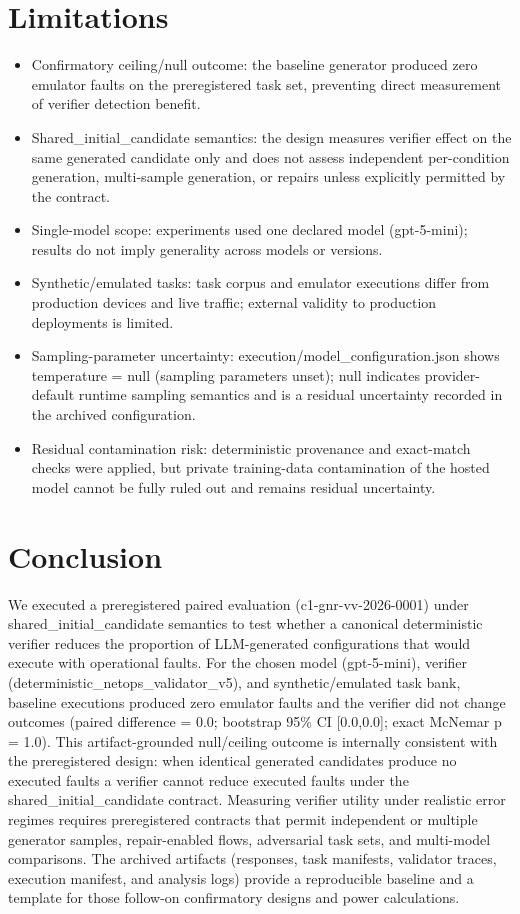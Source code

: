 \documentclass[conference]{IEEEtran}
\begin{document}
\section{Limitations}
\begin{itemize}
\item Confirmatory ceiling/null outcome: the baseline generator produced zero emulator faults on the preregistered task set, preventing direct measurement of verifier detection benefit.
\item Shared\_initial\_candidate semantics: the design measures verifier effect on the same generated candidate only and does not assess independent per-condition generation, multi-sample generation, or repairs unless explicitly permitted by the contract.
\item Single-model scope: experiments used one declared model (gpt-5-mini); results do not imply generality across models or versions.
\item Synthetic/emulated tasks: task corpus and emulator executions differ from production devices and live traffic; external validity to production deployments is limited.
\item Sampling-parameter uncertainty: execution/model\_configuration.json shows temperature = null (sampling parameters unset); null indicates provider-default runtime sampling semantics and is a residual uncertainty recorded in the archived configuration.
\item Residual contamination risk: deterministic provenance and exact-match checks were applied, but private training-data contamination of the hosted model cannot be fully ruled out and remains residual uncertainty.
\end{itemize}

\section{Conclusion}
We executed a preregistered paired evaluation (c1-gnr-vv-2026-0001) under shared\_initial\_candidate semantics to test whether a canonical deterministic verifier reduces the proportion of LLM-generated configurations that would execute with operational faults. For the chosen model (gpt-5-mini), verifier (deterministic\_netops\_validator\_v5), and synthetic/emulated task bank, baseline executions produced zero emulator faults and the verifier did not change outcomes (paired difference = 0.0; bootstrap 95\% CI [0.0,0.0]; exact McNemar p = 1.0). This artifact-grounded null/ceiling outcome is internally consistent with the preregistered design: when identical generated candidates produce no executed faults a verifier cannot reduce executed faults under the shared\_initial\_candidate contract. Measuring verifier utility under realistic error regimes requires preregistered contracts that permit independent or multiple generator samples, repair-enabled flows, adversarial task sets, and multi-model comparisons. The archived artifacts (responses, task manifests, validator traces, execution manifest, and analysis logs) provide a reproducible baseline and a template for those follow-on confirmatory designs and power calculations.
\end{document}
